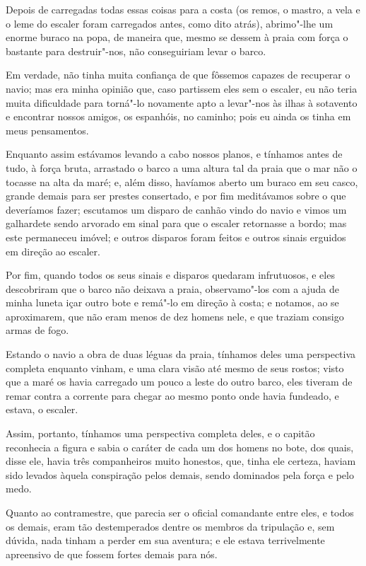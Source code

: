 Depois de carregadas todas essas coisas para a costa (os remos, o
mastro, a vela e o leme do escaler foram carregados antes, como dito
atrás), abrimo"-lhe um enorme buraco na popa, de maneira que, mesmo se
dessem à praia com força o bastante para destruir"-nos, não conseguiriam
levar o barco.

Em verdade, não tinha muita confiança de que fôssemos capazes de
recuperar o navio; mas era minha opinião que, caso partissem eles sem o
escaler, eu não teria muita dificuldade para torná"-lo novamente apto a
levar"-nos às ilhas à sotavento e encontrar nossos amigos, os espanhóis,
no caminho; pois eu ainda os tinha em meus pensamentos.

Enquanto assim estávamos levando a cabo nossos planos, e tínhamos antes
de tudo, à força bruta, arrastado o barco a uma altura tal da praia que
o mar não o tocasse na alta da maré; e, além disso, havíamos aberto um
buraco em seu casco, grande demais para ser prestes consertado, e por
fim meditávamos sobre o que deveríamos fazer; escutamos um disparo de
canhão vindo do navio e vimos um galhardete sendo arvorado em sinal para
que o escaler retornasse a bordo; mas este permaneceu imóvel; e outros
disparos foram feitos e outros sinais erguidos em direção ao escaler.

Por fim, quando todos os seus sinais e disparos quedaram infrutuosos, e
eles descobriram que o barco não deixava a praia, observamo"-los com a
ajuda de minha luneta içar outro bote e remá"-lo em direção à costa; e
notamos, ao se aproximarem, que não eram menos de dez homens nele, e que
traziam consigo armas de fogo.

Estando o navio a obra de duas léguas da praia, tínhamos deles uma
perspectiva completa enquanto vinham, e uma clara visão até mesmo de
seus rostos; visto que a maré os havia carregado um pouco a leste do
outro barco, eles tiveram de remar contra a corrente para chegar ao
mesmo ponto onde havia fundeado, e estava, o escaler.

Assim, portanto, tínhamos uma perspectiva completa deles, e o capitão
reconhecia a figura e sabia o caráter de cada um dos homens no bote, dos
quais, disse ele, havia três companheiros muito honestos, que, tinha ele
certeza, haviam sido levados àquela conspiração pelos demais, sendo
dominados pela força e pelo medo.

Quanto ao contramestre, que parecia ser o oficial comandante entre eles,
e todos os demais, eram tão destemperados dentre os membros da
tripulação e, sem dúvida, nada tinham a perder em sua aventura; e ele
estava terrivelmente apreensivo de que fossem fortes demais para nós.

